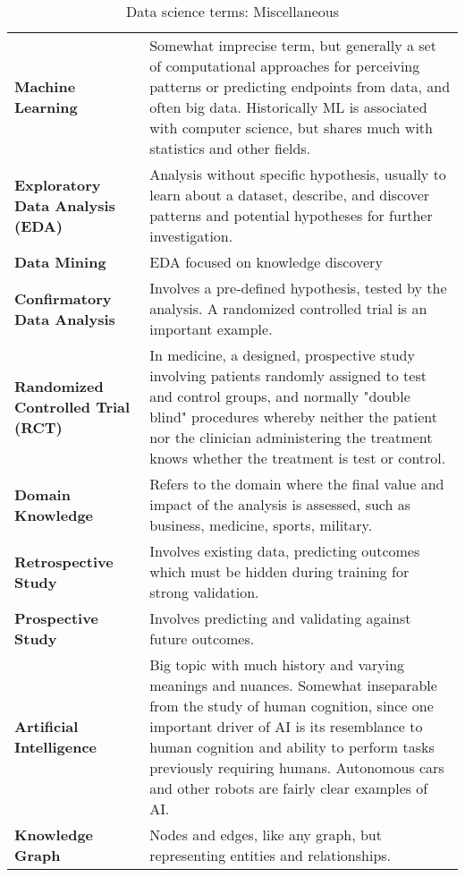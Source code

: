 \begin{appendices}
\begin{table}
\caption{Data science terms: Miscellaneous}
\begin{tabular}{p{0.3\linewidth}p{0.7\linewidth}}
\hline
\textbf{Machine Learning} & Somewhat imprecise term, but generally a set of computational approaches for perceiving patterns or predicting endpoints from data, and
often big data.  Historically ML is associated with computer science, but shares much with statistics and other fields. \\
\textbf{Exploratory Data Analysis (EDA)} & Analysis without specific hypothesis, usually to learn about a dataset, describe, and discover patterns and potential
hypotheses for further investigation. \\
\textbf{Data Mining} & EDA focused on knowledge discovery \\
\textbf{Confirmatory Data Analysis} & Involves a pre-defined hypothesis, tested by the analysis.  A randomized controlled trial is an important example. \\
\textbf{Randomized Controlled Trial (RCT)} & In medicine, a designed, prospective study involving patients randomly assigned to test and control groups, and
normally "double blind" procedures whereby neither the patient nor the clinician administering the treatment knows whether the treatment is test or control. \\
\textbf{Domain Knowledge} & Refers to the domain where the final value and impact of the analysis is assessed, such as business, medicine, sports, military. \\
\textbf{Retrospective Study} & Involves existing data, predicting outcomes which must be hidden during training for strong validation. \\
\textbf{Prospective Study} & Involves predicting and validating against future outcomes. \\
\textbf{Artificial Intelligence} & Big topic with much history and varying meanings and nuances.  Somewhat inseparable from the study of human cognition, since one
important driver of AI is its resemblance to human cognition and ability to perform tasks previously requiring humans.  Autonomous cars and other robots are fairly
clear examples of AI. \\
\textbf{Knowledge Graph} & Nodes and edges, like any graph, but representing entities and relationships. \\
\hline
\end{tabular}
\end{table}

\end{appendices}
